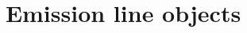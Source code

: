 \documentclass[11pt]{article}
\title{Emission line objects}
\date{}
\begin{document}
\maketitle


\begin{longtable}{cccc}

\end{longtable} 
\end{document}
